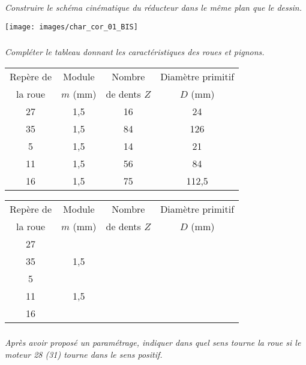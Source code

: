 \documentclass[10pt,fleqn]{article} %
\begin{document}
\begin{multicols}{2}
\begin{multicols}{2}
\subparagraph{}
\textit{ Construire le schéma cinématique du réducteur dans le même plan que le dessin.}
\ifprof
\begin{corrige}
\begin{center}
\texttt{[image: images/char\_cor\_01\_BIS]}
\end{center}
\end{corrige}
\else
\fi
\subparagraph{}
\textit{Compléter le tableau donnant les caractéristiques des roues et pignons.}
\ifprof
\begin{corrige}
\footnotesize
\begin{center}
\begin{tabular}{|c|c|c|c|}
\hline
Repère de  & Module  & Nombre & Diamètre primitif  \\
la roue & $m$ (mm) & de dents $Z$ & $D$ (mm) \\
\hline
\hline
27 & 1,5 &16 & 24\\ \hline
35 & 1,5 &84 & 126\\ \hline
5   &1,5 &14 & 21\\ \hline
11 & 1,5 & 56 & 84 \\ \hline
16 &  1,5&  75& 112,5\\ \hline

\end{tabular}
\end{center}

\normalsize
\end{corrige}
\else
\footnotesize
\begin{center}
\begin{tabular}{|c|c|c|c|}
\hline
Repère de  & Module  & Nombre & Diamètre primitif  \\
la roue & $m$ (mm) & de dents $Z$ & $D$ (mm) \\
\hline
\hline
27 & & & \\ \hline
35 & 1,5& & \\ \hline
5& & & \\ \hline
11& 1,5 & & \\ \hline
16& & & \\ \hline

\end{tabular}
\end{center}

\normalsize
\fi



\subparagraph{}
\textit{Après avoir proposé un paramétrage, indiquer dans quel sens tourne la roue si le moteur 28 (31) tourne dans le sens positif.}


\end{multicols}
\end{multicols}
\end{document}
